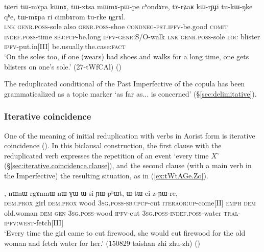 \begin{exe}
\ex \label{ex:tWxtsa.mWmApWpe}
\gll tɕeri tɯ-mɤpa kɯnɤ, tɯ-xtsa mɯ\redp{}mɤ-pɯ-pe cʰondɤre,  tɤ-rʑaʁ kɯ-rɲɟi tu-kɯ-ŋke qʰe, tɯ-mɤpa ri cimbɤrom tu-rke ŋgrɤl. \\
\textsc{lnk} \textsc{genr}.\textsc{poss}-sole also \textsc{genr}.\textsc{poss}-shoe \textsc{cond}\redp{}\textsc{neg}-\textsc{pst}.\textsc{ipfv}-be.good  \textsc{comit} \textsc{indef}.\textsc{poss}-time \textsc{sbj}:\textsc{pcp}-be.long \textsc{ipfv}-\textsc{genr}:S/O-walk \textsc{lnk} \textsc{genr}.\textsc{poss}-sole \textsc{loc} blister \textsc{ipfv}-put.in[III] be.usually.the.case:\textsc{fact} \\
\glt `On the soles too, if one (wears) bad shoes and walks for a long time, one gets blisters on one's sole.' (27-tWfCAl)
()
\end{exe}

The reduplicated conditional  of the Past Imperfective of the copula  has been grammaticalized as a topic marker  `as far as... is concerned' (§\ref{sec:delimitative}).


\subsubsection{Iterative coincidence} \label{sec:iterative.coincidence}
One of the meaning of initial reduplication with verbs in Aorist form is iterative coincidence (\citealt[295--296]{jacques14linking}). In this biclausal construction, the first clause with the reduplicated verb expresses the repetition of an event `every time $X$' (§\ref{sec:iterative.coincidence.clause}), and the second clause (with a main verb in the Imperfective) the resulting situation, as in (\ref{ex:tWtAGe.Zo}).

\begin{exe}
\ex \label{ex:tWtAGe.Zo}
, nɯnɯ rgɤnmɯ nɯ ɣɯ ɯ-si ɲɯ-pʰɯt, ɯ-tɯ-ci z-ɲɯ-re, \\
\textsc{dem}.\textsc{prox} girl \textsc{dem}.\textsc{prox} wood \textsc{3sg}.\textsc{poss}-\textsc{sbj}:\textsc{pcp}-cut \textsc{iter}\redp{}\textsc{aor}:\textsc{up}-come[II] \textsc{emph} \textsc{dem} old.woman \textsc{dem} \textsc{gen} \textsc{3sg}.\textsc{poss}-wood \textsc{ipfv}-cut \textsc{3sg}.\textsc{poss}-\textsc{indef}.\textsc{poss}-water \textsc{tral}-\textsc{ipfv}:\textsc{west}-fetch[III] \\
\glt `Every time the girl came to cut firewood, she would cut firewood for the old woman and fetch water for her.' (150829 taishan zhi zhu-zh)
()
\end{exe}


